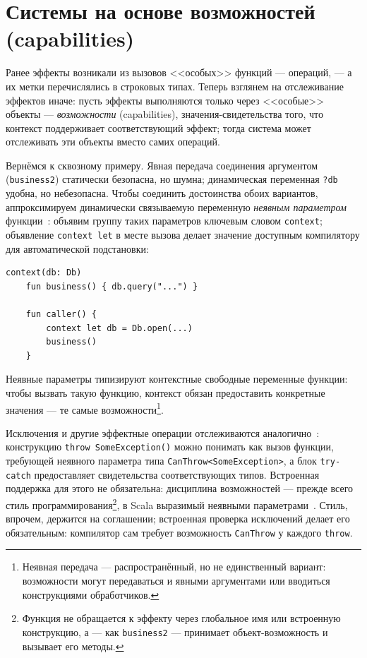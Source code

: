 \documentclass{ProcISPRAS}
\begin{document}
\section{Системы на основе возможностей (capabilities)}
\label{sec:capabilities}

Ранее эффекты возникали из вызовов <<особых>> функций --- операций, --- а их метки
перечислялись в строковых типах. Теперь взглянем на отслеживание эффектов иначе: пусть эффекты
выполняются только через <<особые>> объекты --- \emph{возможности} (capabilities),
значения-свидетельства того, что контекст поддерживает соответствующий эффект; тогда
система может отслеживать эти объекты вместо самих операций.

Вернёмся к сквозному примеру. Явная передача соединения аргументом
(\lstinline|business2|) статически безопасна, но шумна; динамическая переменная
\lstinline|?db| удобна, но небезопасна. Чтобы соединить достоинства обоих вариантов,
аппроксимируем динамически связываемую переменную \emph{неявным параметром}
функции~\cite{lewis2000implicit}: объявим группу таких параметров ключевым словом
\lstinline|context|; объявление \lstinline|context let| в месте вызова делает значение
доступным компилятору для автоматической подстановки:
\begin{lstlisting}[language=colang]
    context(db: Db)
    fun business() { db.query("...") }

    fun caller() {
        context let db = Db.open(...)
        business()
    }
\end{lstlisting}
Неявные параметры типизируют контекстные свободные переменные функции: чтобы вызвать
такую функцию, контекст обязан предоставить конкретные значения --- те самые
возможности\footnote{Неявная передача --- распространённый,
но не единственный вариант: возможности могут передаваться и явными аргументами или
вводиться конструкциями обработчиков.}.

Исключения и другие эффектные операции отслеживаются
аналогично~\cite{odersky2021safer}: конструкцию \lstinline|throw SomeException()| можно
понимать как вызов функции, требующей неявного параметра типа
\lstinline|CanThrow<SomeException>|, а блок \lstinline|try-catch|
предоставляет свидетельства соответствующих типов. Встроенная поддержка для этого
не обязательна: дисциплина возможностей --- прежде всего стиль программирования\footnote{Функция не
обращается к эффекту через глобальное имя или встроенную конструкцию, а --- как
\lstinline|business2| --- принимает объект-возможность и вызывает его методы.}, в Scala
выразимый неявными параметрами~\cite{odersky2004scala}.
Стиль, впрочем, держится на соглашении; встроенная проверка
исключений делает его обязательным: компилятор сам требует
возможность \lstinline|CanThrow| у каждого \lstinline|throw|.
\end{document}
